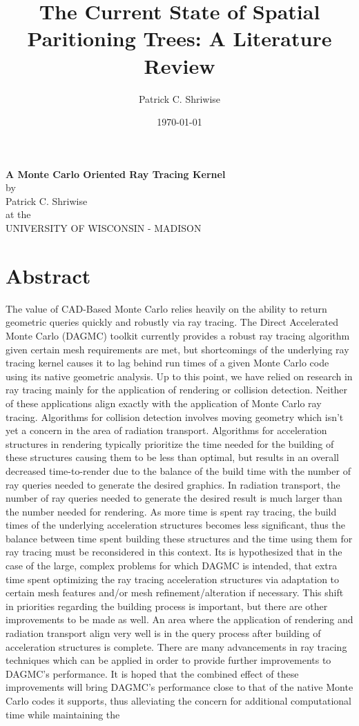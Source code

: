 \documentclass[12pt, a4paper]{article}
\title{\textbf{The Current State of Spatial Paritioning Trees: A Literature Review}}
\author{Patrick C. Shriwise}
\date{\today}
\begin{document}
\begin{center}
  \textbf{A Monte Carlo Oriented Ray Tracing Kernel} \\
  \bigskip
  by \\
  \bigskip
  Patrick C. Shriwise \\
  \bigskip 
  at the \\
  \bigskip
  UNIVERSITY OF WISCONSIN - MADISON \\
\end{center}

\newpage
\tableofcontents 

\section{Abstract}%

The value of CAD-Based Monte Carlo relies heavily on the ability to return geometric queries quickly and robustly via ray tracing. The Direct Accelerated Monte Carlo (DAGMC) toolkit currently provides a robust ray tracing algorithm\cite{smith_thesis_2011} given certain mesh requirements are met, but shortcomings of the underlying ray tracing kernel causes it to lag behind run times of a given Monte Carlo code using its native geometric analysis. Up to this point, we have relied on research in ray tracing mainly for the application of rendering or collision detection. Neither of these applications align exactly with the application of Monte Carlo ray tracing. Algorithms for collision detection involves moving geometry which isn’t yet a concern in the area of radiation transport. Algorithms for acceleration structures in rendering typically prioritize the time needed for the building of these structures causing them to be less than optimal, but results in an overall decreased time-to-render due to the balance of the build time with the number of ray queries needed to generate the desired graphics. In radiation transport, the number of ray queries needed to generate the desired result is much larger than the number needed for rendering. As more time is spent ray tracing, the build times of the underlying acceleration structures becomes less significant, thus the balance between time spent building these structures and the time using them for ray tracing must be reconsidered in this context. Its is hypothesized that in the case of the large, complex problems for which DAGMC is intended, that extra time spent optimizing the ray tracing acceleration structures via adaptation to certain mesh features and/or mesh refinement/alteration if necessary. This shift in priorities regarding the building process is important, but there are other improvements to be made as well. An area where the application of rendering and radiation transport align very well is in the query process after building of acceleration structures is complete. There are many advancements in ray tracing techniques which can be applied in order to provide further improvements to DAGMC’s performance. It is hoped that the combined effect of these improvements will bring DAGMC’s performance close to that of the native Monte Carlo codes it supports, thus alleviating the concern for additional computational time while maintaining the 
\end{document}

